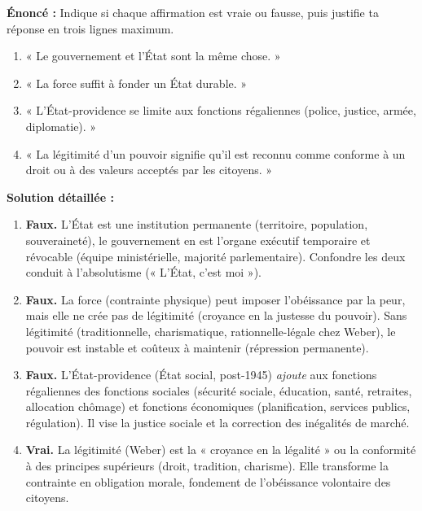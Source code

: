 \documentclass[11pt]{article}
\newcommand{\cle}[1]{{\popxbold\color{popdark}#1}}
\begin{document}
\begin{exoresolu}
\textbf{Énoncé :} Indique si chaque affirmation est vraie ou fausse, puis justifie ta réponse en trois lignes maximum.
\begin{enumerate}
\item « Le gouvernement et l'État sont la même chose. »
\item « La force suffit à fonder un État durable. »
\item « L'État-providence se limite aux fonctions régaliennes (police, justice, armée, diplomatie). »
\item « La légitimité d'un pouvoir signifie qu'il est reconnu comme conforme à un droit ou à des valeurs acceptés par les citoyens. »
\end{enumerate}
\tcblower
\textbf{Solution détaillée :}
\begin{enumerate}
\item \textbf{Faux.} L'\cle{État} est une institution permanente (territoire, population, souveraineté), le \cle{gouvernement} en est l'organe exécutif temporaire et révocable (équipe ministérielle, majorité parlementaire). Confondre les deux conduit à l'absolutisme (« L'État, c'est moi »).
\item \textbf{Faux.} La \cle{force} (contrainte physique) peut imposer l'obéissance par la peur, mais elle ne crée pas de \cle{légitimité} (croyance en la justesse du pouvoir). Sans légitimité (traditionnelle, charismatique, rationnelle-légale chez Weber), le pouvoir est instable et coûteux à maintenir (répression permanente).
\item \textbf{Faux.} L'\cle{État-providence} (État social, post-1945) \emph{ajoute} aux fonctions régaliennes des \cle{fonctions sociales} (sécurité sociale, éducation, santé, retraites, allocation chômage) et \cle{fonctions économiques} (planification, services publics, régulation). Il vise la justice sociale et la correction des inégalités de marché.
\item \textbf{Vrai.} La \cle{légitimité} (Weber) est la « croyance en la légalité » ou la conformité à des principes supérieurs (droit, tradition, charisme). Elle transforme la contrainte en obligation morale, fondement de l'obéissance volontaire des citoyens.
\end{enumerate}
\end{exoresolu}
\end{document}
